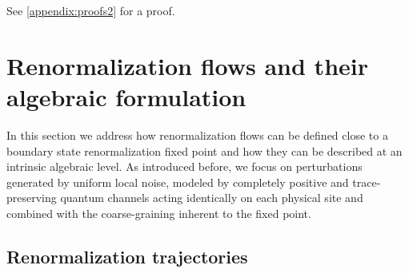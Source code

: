 \documentclass[a4paper,10pt]{amsart}
\theoremstyle{definition}
\begin{document}
See \cref{appendix:proofs2} for a proof.

\section{Renormalization flows and their algebraic formulation}
\label{sec:flows}

In this section we address how renormalization flows can be defined close to a boundary state renormalization fixed point and how they can be described at an intrinsic algebraic level.
As introduced before, we focus on perturbations generated by uniform local noise, modeled by completely positive and trace-preserving quantum channels acting identically on each physical site and combined with the coarse-graining inherent to the fixed point.

\subsection{Renormalization trajectories} \label{sec:trajectories}
\end{document}
